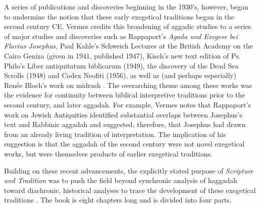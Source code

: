 A series of publications and discoveries beginning in the 1930's,
however, began to undermine the notion that these early exegetical
traditions began in the second century CE. Vermes credits this
broadening of aggadic studies to a series of major studies and
discoveries such as Rappaport's \emph{Agada und Exegese bei Flavius
Josephus},\autocite{rappaport1930} Paul Kahle's Schweich Lectures at the
British Academy on the Cairo Geniza (given in 1941, published
1947),\autocite{kahle1947} Kisch's new text edition of Ps. Philo's
Liber antiquitatum biblicarum (1949),\autocite{kisch1949} the discovery
of the Dead Sea Scrolls (1948) and Codex Neofiti (1956), as well as (and
perhaps especially) Renée Bloch's work on midrash
\autocites{bloch1954}{bloch1955_repr}[3--7]{vermes1961}. The overarching
theme among these works was the evidence for continuity between biblical
interpretive traditions prior to the second century, and later aggadah.
For example, Vermes notes that Rappaport's work on Jewish Antiquities
identified substantial overlaps between Josephus's text and Rabbinic
aggadah and suggested, therefore, that Josephus had drawn from an
already living tradition of interpretation. The implication of his
suggestion is that the aggadah of the second century were not novel
exegetical works, but were themselves products of earlier exegetical
traditions.

Building on these recent advancements, the explicitly stated purpose of
\emph{Scripture and Tradition} was to push the field beyond synchronic
analysis of haggadah toward diachronic, historical analyses to trace the
development of these exegetical traditions \autocites[1]{vermes1961}[See
esp.][GET\_PAGE]{bloch1955_repr}. The book is eight chapters long and is
divided into four parts.

